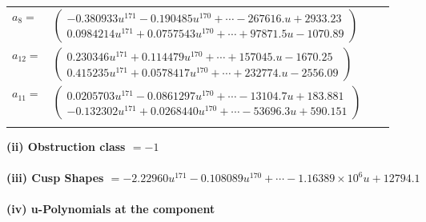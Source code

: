 \documentclass[1p]{elsarticle_modified}
\theoremstyle{definition}
\begin{document}
\begin{tabular}{m{7pt} m{180pt} m{7pt} m{180pt} }
\flushright $a_{8}=$&$\begin{pmatrix}-0.380933 u^{171}-0.190485 u^{170}+\cdots-267616. u+2933.23\\0.0984214 u^{171}+0.0757543 u^{170}+\cdots+97871.5 u-1070.89\end{pmatrix}$ \\
\flushright $a_{12}=$&$\begin{pmatrix}0.230346 u^{171}+0.114479 u^{170}+\cdots+157045. u-1670.25\\0.415235 u^{171}+0.0578417 u^{170}+\cdots+232774. u-2556.09\end{pmatrix}$ \\
\flushright $a_{11}=$&$\begin{pmatrix}0.0205703 u^{171}-0.0861297 u^{170}+\cdots-13104.7 u+183.881\\-0.132302 u^{171}+0.0268440 u^{170}+\cdots-53696.3 u+590.151\end{pmatrix}$\\&\end{tabular}
\flushleft \textbf{(ii) Obstruction class $= -1$}\\~\\
\flushleft \textbf{(iii) Cusp Shapes $= -2.22960 u^{171}-0.108089 u^{170}+\cdots-1.16389\times10^{6} u+12794.1$}\\~\\
\newpage\renewcommand{\arraystretch}{1}
\flushleft \textbf{(iv) u-Polynomials at the component}\newline \\
\end{document}
